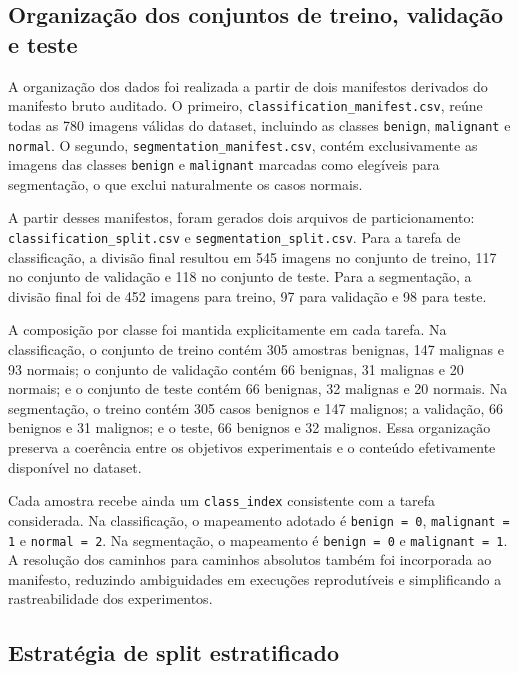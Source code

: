 \documentclass[tcc,capa]{texufpel}
\begin{document}
\subsection{Organização dos conjuntos de treino, validação e teste}

A organização dos dados foi realizada a partir de dois manifestos derivados do manifesto bruto auditado. O primeiro, \texttt{classification\_manifest.csv}, reúne todas as 780 imagens válidas do dataset, incluindo as classes \texttt{benign}, \texttt{malignant} e \texttt{normal}. O segundo, \texttt{segmentation\_manifest.csv}, contém exclusivamente as imagens das classes \texttt{benign} e \texttt{malignant} marcadas como elegíveis para segmentação, o que exclui naturalmente os casos normais.

A partir desses manifestos, foram gerados dois arquivos de particionamento: \texttt{classification\_split.csv} e \texttt{segmentation\_split.csv}. Para a tarefa de classificação, a divisão final resultou em 545 imagens no conjunto de treino, 117 no conjunto de validação e 118 no conjunto de teste. Para a segmentação, a divisão final foi de 452 imagens para treino, 97 para validação e 98 para teste.

A composição por classe foi mantida explicitamente em cada tarefa. Na classificação, o conjunto de treino contém 305 amostras benignas, 147 malignas e 93 normais; o conjunto de validação contém 66 benignas, 31 malignas e 20 normais; e o conjunto de teste contém 66 benignas, 32 malignas e 20 normais. Na segmentação, o treino contém 305 casos benignos e 147 malignos; a validação, 66 benignos e 31 malignos; e o teste, 66 benignos e 32 malignos. Essa organização preserva a coerência entre os objetivos experimentais e o conteúdo efetivamente disponível no dataset.

Cada amostra recebe ainda um \texttt{class\_index} consistente com a tarefa considerada. Na classificação, o mapeamento adotado é \texttt{benign = 0}, \texttt{malignant = 1} e \texttt{normal = 2}. Na segmentação, o mapeamento é \texttt{benign = 0} e \texttt{malignant = 1}. A resolução dos caminhos para caminhos absolutos também foi incorporada ao manifesto, reduzindo ambiguidades em execuções reprodutíveis e simplificando a rastreabilidade dos experimentos.

\subsection{Estratégia de split estratificado}
\end{document}
